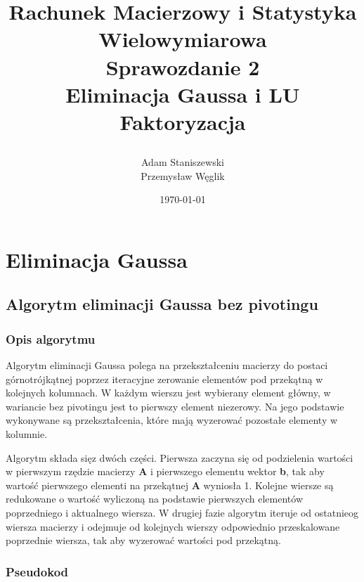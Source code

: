 \documentclass[12pt,a4paper,table]{article}
\begin{document}
    \title {
        Rachunek Macierzowy i Statystyka Wielowymiarowa \\
        Sprawozdanie 2 \\
        Eliminacja Gaussa i LU Faktoryzacja

    }

    \author{
        Adam Staniszewski \\
        Przemysław Węglik
    }

    \date{\today}

    \maketitle

    \tableofcontents
    \newpage

    \section{Eliminacja Gaussa}

    \subsection{Algorytm eliminacji Gaussa bez pivotingu}
    \subsubsection{Opis algorytmu}
    Algorytm eliminacji Gaussa polega na przekształceniu macierzy do postaci górnotrójkątnej poprzez iteracyjne zerowanie elementów pod przekątną w kolejnych kolumnach. W każdym wierszu jest wybierany element główny, w wariancie bez pivotingu jest to pierwszy element niezerowy. Na jego podstawie wykonywane są przekształcenia, które mają wyzerować pozostałe elementy w kolumnie. 

    Algorytm składa sięz dwóch części. Pierwsza zaczyna się od podzielenia wartości w pierwszym rzędzie macierzy \textbf{A} i pierwszego elementu wektor \textbf{b}, tak aby wartość pierwszego elementi na przekątnej \textbf{A} wyniosła 1. Kolejne wiersze są redukowane o wartość wyliczoną na podstawie pierwszych elementów poprzedniego i aktualnego wiersza. 
    W drugiej fazie algorytm iteruje od ostatnieog wiersza macierzy i odejmuje od kolejnych wierszy odpowiednio przeskalowane poprzednie wiersza, tak aby wyzerować wartości pod przekątną.

    \subsubsection{Pseudokod}
\end{document}
